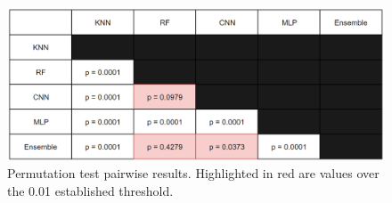 \begin{figure}[H]
  \centering
  \centerline{\includegraphics[scale=0.43]{Images/p_values.png}}
  \caption{Permutation test pairwise results. Highlighted in red are values over the 0.01 established threshold.}
  \label{p_values}
\end{figure}





